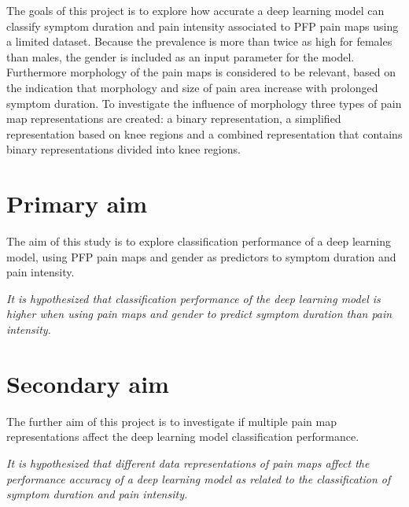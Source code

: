 \noindent
The goals of this project is to explore how accurate a deep learning model can classify symptom duration and pain intensity associated to PFP pain maps using a limited dataset. Because the prevalence is more than twice as high for females than males, the gender is included as an input parameter for the model. 
Furthermore morphology of the pain maps is considered to be relevant, based on the indication that morphology and size of pain area increase with prolonged symptom duration. 
To investigate the influence of morphology three types of pain map representations are created: a binary representation, a simplified representation based on knee regions and a combined representation that contains binary representations divided into knee regions.   

\section{Primary aim}
The aim of this study is to explore classification performance of a deep learning model, using PFP pain maps and gender as predictors to symptom duration and pain intensity. 
\vspace{4mm}
\noindent
\begin{center}
\textit{It is hypothesized that classification performance of the deep learning model is higher when using pain maps and gender to predict symptom duration than pain intensity.}
\end{center}

\section{Secondary aim}
The further aim of this project is to investigate if multiple pain map representations affect the deep learning model classification performance.

\vspace{4mm}
\noindent
\begin{center}
\textit{It is hypothesized that different data representations of pain maps affect the performance
accuracy of a deep learning model as related to the classification of symptom duration and pain intensity.
}
\end{center}


